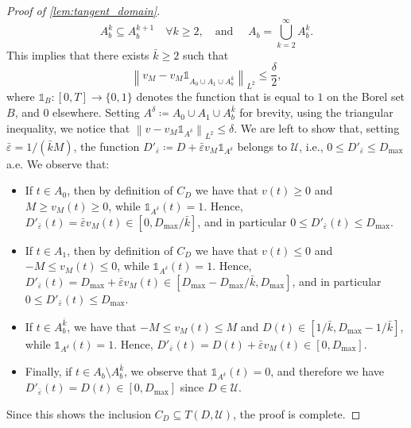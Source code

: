 \documentclass[a4paper,12pt, reqno]{amsart}
\theoremstyle{plain}
\theoremstyle{definition}
\theoremstyle{remark}
\numberwithin{equation}{section}
\newcommand{\U}{\mathcal{U}}
\newcommand{\e}{\varepsilon}
\begin{document}
\begin{appendix}
\begin{proof}[Proof of \cref{lem:tangent_domain}]
\begin{equation*}
        A_b^k\subseteq A_b^{k+1} \quad \forall k\geq 2, \quad \mbox{and } \quad
        A_b= \bigcup_{k=2}^\infty
        A_b^k.
    \end{equation*}
    This implies that there exists $\bar k\geq 2$ such that 
    \begin{equation*}
        \left\| v_M - v_M \mathds{1}_{A_0\cup A_1\cup A_b^{\bar k}}  \right\|_{L^2}\leq \frac\delta2,    
    \end{equation*}
    where $\mathds{1}_B\colon [0,T]\to \{0,1 \}$ denotes the function that is equal to $1$ on the Borel set $B$, and $0$ elsewhere. Setting $A^\delta\coloneqq A_0\cup A_1\cup A_b^{\bar k}$ for brevity, using the triangular inequality, we notice that $\left\| v - v_M \mathds{1}_{A^\delta}  \right\|_{L^2}\leq \delta$.
    We are left to show that, setting $\bar \e = 1/(\bar k  M)$, the function ${D}'_{\bar \e}\coloneqq {D} + \bar \e v_M\mathds{1}_{A^\delta}$ belongs to $\U$, i.e., $0\leq {D}'_{\bar \e} \leq {D_{\max}}$ a.e.
    We observe that:
    \begin{itemize}
        \item If $t \in A_0$, then by definition of $C_{D}$ we have that $v(t)\geq 0$ and $M\geq v_M(t) \geq 0$, while $\mathds{1}_{A^\delta}(t)=1$.
        Hence, ${D}'_{\bar \e}(t) = \bar \e v_M(t) \in [0, {D_{\max}}/\bar k]$, and in particular $0\leq {D}'_{\bar \e}(t) \leq {D_{\max}}$.
        \item If $t \in A_1$, then by definition of $C_{D}$ we have that $v(t)\leq 0$ and $-M \leq v_M(t) \leq 0$, while $\mathds{1}_{A^\delta}(t)=1$.
        Hence, ${D}'_{\bar \e}(t) = {D_{\max}} + \bar \e v_M(t) \in [{D_{\max}}- {D_{\max}}/\bar k, {D_{\max}}]$, and in particular $0\leq {D}'_{\bar \e}(t) \leq {D_{\max}}$.
        \item If $t \in A_b^{\bar k}$, we have that $-M \leq v_M(t) \leq M$ and ${D}(t) \in [1/\bar k, {D_{\max}}-1/\bar k]$, while $\mathds{1}_{A^\delta}(t)=1$.
        Hence, ${D}'_{\bar \e}(t) = {D}(t) + \bar \e v_M(t)\in [0,{D_{\max}}]$.
        \item Finally, if $t \in A_b\setminus A_b^{\bar k}$, we observe that $\mathds{1}_{A^\delta}(t)=0$, and therefore we have ${D}'_{\bar \e}(t) = {D}(t)\in [0,{D_{\max}}]$ since ${D}\in \U$.
    \end{itemize}
    Since this shows the inclusion $C_{D} \subseteq T({D},\U)$, the proof is complete. 
\end{proof}
    
\end{appendix}





\end{document}
